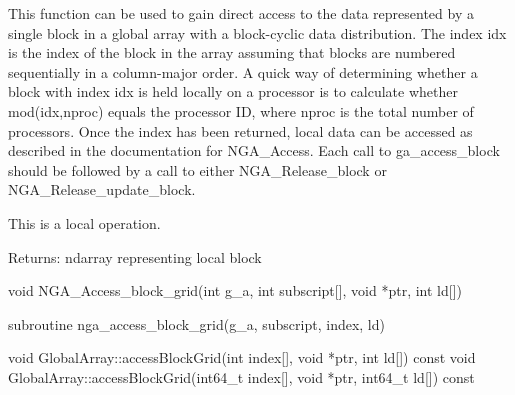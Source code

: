 \documentclass[12pt]{article}
\begin{document}
\begin{desc}

This function can be used to gain direct access to the data represented
by a single block in a global array with a block-cyclic data distribution.
The index idx is the index of the block in the array assuming that blocks
are numbered sequentially in a column-major order. A quick way of determining
whether a block with index idx is held locally on a processor is to calculate
whether mod(idx,nproc) equals the processor ID, where nproc is the total number
of processors. Once the index has been returned, local data can be accessed as
described in the documentation for NGA_Access. Each call to ga_access_block
should be followed by a call to either NGA_Release_block or NGA_Release_update_block.

This is a local operation.

Returns: ndarray representing local block
\end{desc}


\begin{capi}
\begin{ccode}
void NGA_Access_block_grid(int g_a, int subscript[], void *ptr, int ld[])
\end{ccode}
\begin{funcargs}
\end{funcargs}
\end{capi}

\begin{fapi}
\begin{fcode}
subroutine nga_access_block_grid(g_a, subscript, index, ld)
\end{fcode}
\begin{funcargs}
\end{funcargs}
\end{fapi}

\begin{cxxapi}
\begin{cxxcode}
void GlobalArray::accessBlockGrid(int index[], void *ptr, int ld[]) const
void GlobalArray::accessBlockGrid(int64_t index[], void *ptr, int64_t ld[])
                                  const
\end{cxxcode}
\begin{funcargs}
\end{funcargs}
\end{cxxapi}
\end{document}
